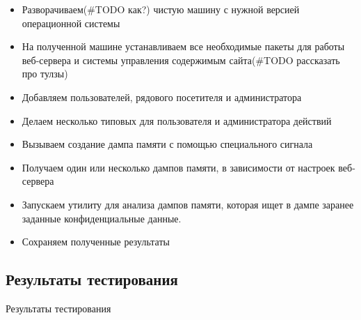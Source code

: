\documentclass[20pt]{article}
\begin{document}
\begin{itemize}
  \item Разворачиваем(\#TODO как?) чистую машину с нужной версией операционной системы
  \item На полученной машине устанавливаем все необходимые пакеты для работы
  веб-сервера и системы управления содержимым сайта(\#TODO рассказать про тулзы)
  \item Добавляем пользователей, рядового посетителя и администратора
  \item Делаем несколько типовых для пользователя и администратора действий
  \item Вызываем создание дампа памяти с помощью специального сигнала
  \item Получаем один или несколько дампов памяти, в зависимости от настроек
  веб-сервера
  \item Запускаем утилиту для анализа дампов памяти, которая ищет в дампе
  заранее заданные конфиденциальные данные.
  \item Сохраняем полученные результаты
\end{itemize}

\subsection{Результаты тестирования}
Результаты тестирования
\end{document}

